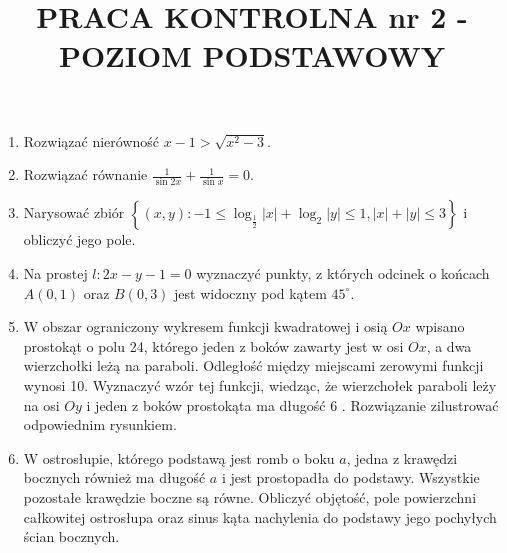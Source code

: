 \documentclass[10pt]{article}
\title{PRACA KONTROLNA nr 2 - POZIOM PODSTAWOWY }
\author{}
\date{}
\begin{document}
\maketitle
\begin{enumerate}
  \item Rozwiązać nierówność $x-1>\sqrt{x^{2}-3}$.
  \item Rozwiązać równanie $\frac{1}{\sin 2 x}+\frac{1}{\sin x}=0$.
  \item Narysować zbiór $\left\{(x, y):-1 \leqslant \log _{\frac{1}{2}}|x|+\log _{2}|y| \leqslant 1,|x|+|y| \leqslant 3\right\}$ i obliczyć jego pole.
  \item Na prostej $l: 2 x-y-1=0$ wyznaczyć punkty, z których odcinek o końcach $A(0,1)$ oraz $B(0,3)$ jest widoczny pod kątem $45^{\circ}$.
  \item W obszar ograniczony wykresem funkcji kwadratowej i osią $O x$ wpisano prostokąt o polu 24, którego jeden z boków zawarty jest w osi $O x$, a dwa wierzchołki leżą na paraboli. Odległość między miejscami zerowymi funkcji wynosi 10. Wyznaczyć wzór tej funkcji, wiedząc, że wierzchołek paraboli leży na osi $O y$ i jeden z boków prostokąta ma długość 6 . Rozwiązanie zilustrować odpowiednim rysunkiem.
  \item W ostrosłupie, którego podstawą jest romb o boku $a$, jedna z krawędzi bocznych również ma długość $a$ i jest prostopadła do podstawy. Wszystkie pozostałe krawędzie boczne są równe. Obliczyć objętość, pole powierzchni całkowitej ostrosłupa oraz sinus kąta nachylenia do podstawy jego pochyłych ścian bocznych.
\end{enumerate}
\end{document}
